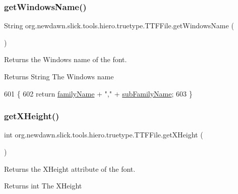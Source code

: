 \subsubsection{\texorpdfstring{get\+Windows\+Name()}{getWindowsName()}}
{\footnotesize\ttfamily String org.\+newdawn.\+slick.\+tools.\+hiero.\+truetype.\+T\+T\+F\+File.\+get\+Windows\+Name (\begin{DoxyParamCaption}{ }\end{DoxyParamCaption})\hspace{0.3cm}{\ttfamily [inline]}}

Returns the Windows name of the font. \begin{DoxyReturn}{Returns}
String The Windows name 
\end{DoxyReturn}

\begin{DoxyCode}
601                                    \{
602         \textcolor{keywordflow}{return} \mbox{\hyperlink{classorg_1_1newdawn_1_1slick_1_1tools_1_1hiero_1_1truetype_1_1_t_t_f_file_a9888cb4831ec8b916a0a8ac0f6865bbe}{familyName}} + \textcolor{stringliteral}{","} + \mbox{\hyperlink{classorg_1_1newdawn_1_1slick_1_1tools_1_1hiero_1_1truetype_1_1_t_t_f_file_a5584d310e65c24aa3ea85ce0afe13401}{subFamilyName}};
603     \}
\end{DoxyCode}
\mbox{\label{classorg_1_1newdawn_1_1slick_1_1tools_1_1hiero_1_1truetype_1_1_t_t_f_file_af74c17082032ef479dc819f858304d44}} 
\subsubsection{\texorpdfstring{get\+X\+Height()}{getXHeight()}}
{\footnotesize\ttfamily int org.\+newdawn.\+slick.\+tools.\+hiero.\+truetype.\+T\+T\+F\+File.\+get\+X\+Height (\begin{DoxyParamCaption}{ }\end{DoxyParamCaption})\hspace{0.3cm}{\ttfamily [inline]}}

Returns the X\+Height attribute of the font. \begin{DoxyReturn}{Returns}
int The X\+Height 
\end{DoxyReturn}

